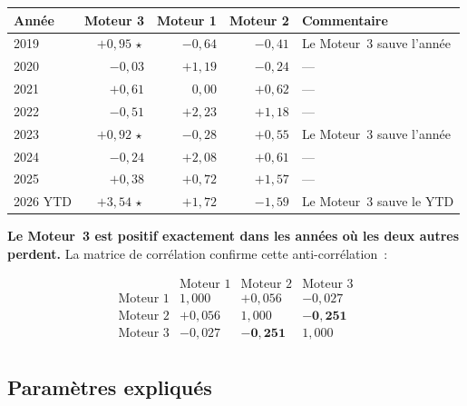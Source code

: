 \documentclass[11pt, a4paper]{scrartcl}
\begin{document}
\begin{center}
\renewcommand{\arraystretch}{1.1}
\begin{tabular}{lrrr p{4cm}}
\toprule
\textbf{Année} & \textbf{Moteur 3} & \textbf{Moteur 1} & \textbf{Moteur 2} & \textbf{Commentaire} \\
\midrule
2019 & \textcolor{rsiGreen}{$+0{,}95\,\star$} & $-0{,}64$ & $-0{,}41$ & Le Moteur~3 sauve l'année \\
2020 & $-0{,}03$ & $+1{,}19$ & $-0{,}24$ & --- \\
2021 & $+0{,}61$ & $0{,}00$ & $+0{,}62$ & --- \\
2022 & $-0{,}51$ & \textcolor{rsiGreen}{$+2{,}23$} & $+1{,}18$ & --- \\
2023 & \textcolor{rsiGreen}{$+0{,}92\,\star$} & $-0{,}28$ & $+0{,}55$ & Le Moteur~3 sauve l'année \\
2024 & $-0{,}24$ & $+2{,}08$ & $+0{,}61$ & --- \\
2025 & $+0{,}38$ & $+0{,}72$ & $+1{,}57$ & --- \\
2026 YTD & \textcolor{rsiGreen}{$+3{,}54\,\star$} & $+1{,}72$ & $-1{,}59$ & Le Moteur~3 sauve le YTD \\
\bottomrule
\end{tabular}
\end{center}

\textbf{Le Moteur~3 est positif exactement dans les années où les deux autres perdent.} La matrice de corrélation confirme cette anti-corrélation~:

\[
\begin{array}{l|rrr}
 & \text{Moteur 1} & \text{Moteur 2} & \text{Moteur 3} \\
\hline
\text{Moteur 1} & 1{,}000  & +0{,}056 & -0{,}027 \\
\text{Moteur 2} & +0{,}056 & 1{,}000  & \mathbf{-0{,}251} \\
\text{Moteur 3} & -0{,}027 & \mathbf{-0{,}251} & 1{,}000 \\
\end{array}
\]

\subsection{Paramètres expliqués}
\end{document}
